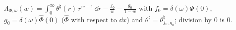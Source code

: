 $\Lambda_{\Phi,\omega}(w)=\int_0^\infty\theta^\natural(r)\,r^{w-1}\,\dd r-\frac{f_0}w-\frac{g_0}{1-w}$ with $f_0=\delta(\omega)\Phi(0)$, $g_0=\delta(\omega)\hat\Phi(0)$ ($\hat\Phi$ with respect to $\dd x$) and $\theta^\natural=\theta^\natural_{f_0,g_0}$; division by $0$ is $0$.

